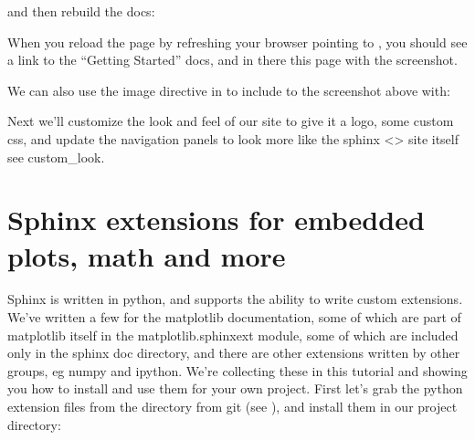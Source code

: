 \documentclass[letterpaper,10pt,english]{sphinxmanual}
\begin{document}
\begin{sphinxVerbatim}[commandchars=\\\{\}]

 
    

\end{sphinxVerbatim}

\sphinxAtStartPar
and then rebuild the docs:

\begin{sphinxVerbatim}[commandchars=\\\{\}]
 
 
\end{sphinxVerbatim}

\sphinxAtStartPar
When you reload the page by refreshing your browser pointing to
, you should see a link to the
“Getting Started” docs, and in there this page with the screenshot.

\sphinxAtStartPar
We can also use the image directive in  to include to the screenshot above
with:

\begin{sphinxVerbatim}[commandchars=\\\{\}]
 
\end{sphinxVerbatim}

\sphinxAtStartPar
Next we’ll customize the look and feel of our site to give it a logo,
some custom css, and update the navigation panels to look more like
the sphinx \textless{}\textgreater{} site itself \textendash{} see custom\_look.

\sphinxstepscope


\chapter{Sphinx extensions for embedded plots, math and more}
\label{\detokenize{chapter2:sphinx-extensions-for-embedded-plots-math-and-more}}\label{\detokenize{chapter2:extensions}}\label{\detokenize{chapter2::doc}}
\sphinxAtStartPar
Sphinx is written in python, and supports the ability to write custom
extensions.  We’ve written a few for the matplotlib documentation,
some of which are part of matplotlib itself in the
matplotlib.sphinxext module, some of which are included only in the
sphinx doc directory, and there are other extensions written by other
groups, eg numpy and ipython.  We’re collecting these in this tutorial
and showing you how to install and use them for your own project.
First let’s grab the python extension files from the 
directory from git (see {\hyperref[\detokenize{chapter1:fetching-the-data}]{}}), and install them in
our  project  directory:
\end{document}
